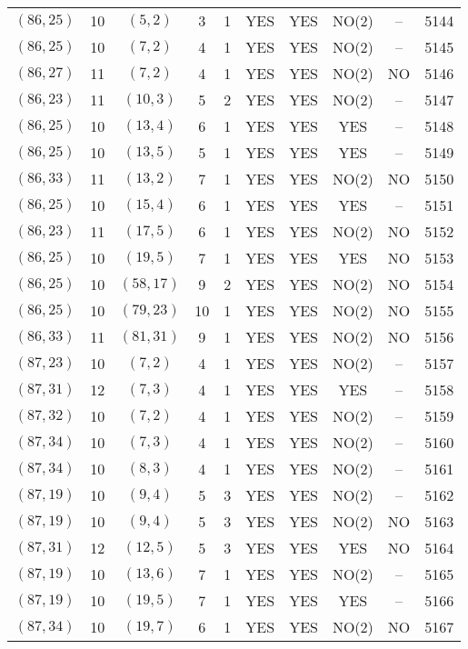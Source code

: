 \begin{longtable}{|c|c|c|c|c|c|c|c|c|c|}
$(86, 25)$ & 10 & $(5, 2)$ & 3 & 1 & YES & YES & NO(2) & -- & 5144\\
$(86, 25)$ & 10 & $(7, 2)$ & 4 & 1 & YES & YES & NO(2) & -- & 5145\\
$(86, 27)$ & 11 & $(7, 2)$ & 4 & 1 & YES & YES & NO(2) & NO & 5146\\
$(86, 23)$ & 11 & $(10, 3)$ & 5 & 2 & YES & YES & NO(2) & -- & 5147\\
$(86, 25)$ & 10 & $(13, 4)$ & 6 & 1 & YES & YES & YES & -- & 5148\\
$(86, 25)$ & 10 & $(13, 5)$ & 5 & 1 & YES & YES & YES & -- & 5149\\
$(86, 33)$ & 11 & $(13, 2)$ & 7 & 1 & YES & YES & NO(2) & NO & 5150\\
$(86, 25)$ & 10 & $(15, 4)$ & 6 & 1 & YES & YES & YES & -- & 5151\\
$(86, 23)$ & 11 & $(17, 5)$ & 6 & 1 & YES & YES & NO(2) & NO & 5152\\
$(86, 25)$ & 10 & $(19, 5)$ & 7 & 1 & YES & YES & YES & NO & 5153\\
$(86, 25)$ & 10 & $(58, 17)$ & 9 & 2 & YES & YES & NO(2) & NO & 5154\\
$(86, 25)$ & 10 & $(79, 23)$ & 10 & 1 & YES & YES & NO(2) & NO & 5155\\
$(86, 33)$ & 11 & $(81, 31)$ & 9 & 1 & YES & YES & NO(2) & NO & 5156\\
$(87, 23)$ & 10 & $(7, 2)$ & 4 & 1 & YES & YES & NO(2) & -- & 5157\\
$(87, 31)$ & 12 & $(7, 3)$ & 4 & 1 & YES & YES & YES & -- & 5158\\
$(87, 32)$ & 10 & $(7, 2)$ & 4 & 1 & YES & YES & NO(2) & -- & 5159\\
$(87, 34)$ & 10 & $(7, 3)$ & 4 & 1 & YES & YES & NO(2) & -- & 5160\\
$(87, 34)$ & 10 & $(8, 3)$ & 4 & 1 & YES & YES & NO(2) & -- & 5161\\
$(87, 19)$ & 10 & $(9, 4)$ & 5 & 3 & YES & YES & NO(2) & -- & 5162\\
$(87, 19)$ & 10 & $(9, 4)$ & 5 & 3 & YES & YES & NO(2) & NO & 5163\\
$(87, 31)$ & 12 & $(12, 5)$ & 5 & 3 & YES & YES & YES & NO & 5164\\
$(87, 19)$ & 10 & $(13, 6)$ & 7 & 1 & YES & YES & NO(2) & -- & 5165\\
$(87, 19)$ & 10 & $(19, 5)$ & 7 & 1 & YES & YES & YES & -- & 5166\\
$(87, 34)$ & 10 & $(19, 7)$ & 6 & 1 & YES & YES & NO(2) & NO & 5167\\

\end{longtable}

